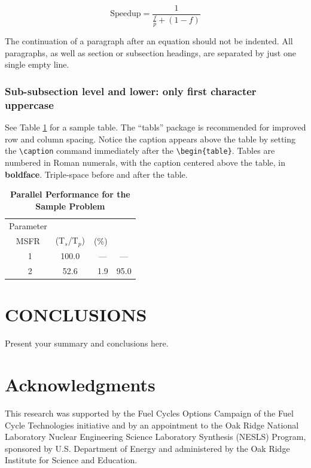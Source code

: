 \documentclass{anstrans}
\begin{document}
\begin{equation}
  \label{sample_equation}
  \mathrm{Speedup}=\frac{1}{\frac{f}{p}+(1-f)}
\end{equation}

The continuation of a paragraph after an equation should not be indented.  
All paragraphs, as well as section or subsection headings, are separated by 
just one single empty line.

\subsubsection{Sub-subsection level and lower: only first character uppercase}

See Table \ref{table:example} for a sample table.  The ``tabls'' package is
recommended for improved row and column spacing.  Notice the caption appears 
above the table by setting the \verb!\caption! command immediately 
after the \verb!\begin{table}!. Tables are numbered in Roman 
numerals, with the caption centered above the table, in \textbf{boldface}.  
Triple-space before and after the table.

\begin{table}[!htb]
  \centering
  \caption{\bf Parallel Performance for the Sample Problem}
  \label{table:example} 
  \begin{tabular}{|c|c|c|c|} \hline 
   Parameter \\ \gls{MSFR} & (T$_{s}$/T$_{p}$) & (\%) \\ \hline
    \ 1 &  100.0 & \ ---    & ---  \\ \hline
    \ 2 &   52.6 & \ 1.9    & 95.0 \\ \hline 
  \end{tabular}
\end{table}

\section{CONCLUSIONS}

Present your summary and conclusions here.
\section{Acknowledgments}
This research was supported by the Fuel Cycles Options Campaign of the Fuel Cycle Technologies initiative 
and by an appointment to the Oak Ridge National Laboratory Nuclear Engineering Science Laboratory Synthesis (NESLS) Program, sponsored by U.S. Department of Energy and administered by the Oak Ridge Institute for Science and Education.



\end{document}
